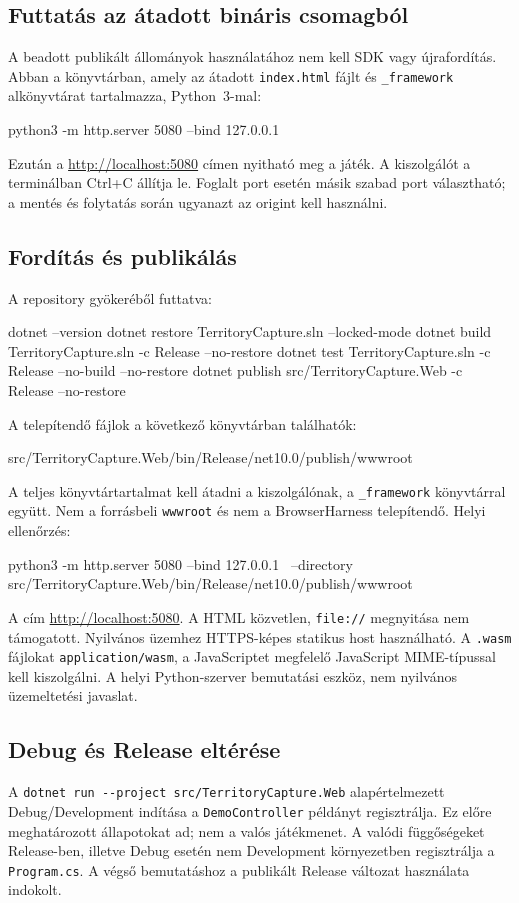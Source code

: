 \documentclass[11pt,a4paper]{article}
\newcommand{\code}[1]{\nolinkurl{#1}}
\begin{document}
\subsection{Futtatás az átadott bináris csomagból}
A beadott publikált állományok használatához nem kell SDK vagy újrafordítás. Abban a könyvtárban, amely az átadott \code{index.html} fájlt és \code{_framework} alkönyvtárat tartalmazza, Python~3-mal:
\begin{commands}
python3 -m http.server 5080 --bind 127.0.0.1
\end{commands}
Ezután a \url{http://localhost:5080} címen nyitható meg a játék. A kiszolgálót a terminálban Ctrl+C állítja le. Foglalt port esetén másik szabad port választható; a mentés és folytatás során ugyanazt az origint kell használni.

\subsection{Fordítás és publikálás}
A repository gyökeréből futtatva:
\begin{commands}
dotnet --version
dotnet restore TerritoryCapture.sln --locked-mode
dotnet build TerritoryCapture.sln -c Release --no-restore
dotnet test TerritoryCapture.sln -c Release --no-build --no-restore
dotnet publish src/TerritoryCapture.Web -c Release --no-restore
\end{commands}
A telepítendő fájlok a következő könyvtárban találhatók:
\begin{commands}
src/TerritoryCapture.Web/bin/Release/net10.0/publish/wwwroot
\end{commands}
A teljes könyvtártartalmat kell átadni a kiszolgálónak, a \code{_framework} könyvtárral együtt. Nem a forrásbeli \code{wwwroot} és nem a BrowserHarness telepítendő. Helyi ellenőrzés:
\begin{commands}
python3 -m http.server 5080 --bind 127.0.0.1 \
  --directory src/TerritoryCapture.Web/bin/Release/net10.0/publish/wwwroot
\end{commands}
A cím \url{http://localhost:5080}. A HTML közvetlen, \code{file://} megnyitása nem támogatott. Nyilvános üzemhez HTTPS-képes statikus host használható. A \code{.wasm} fájlokat \code{application/wasm}, a JavaScriptet megfelelő JavaScript MIME-típussal kell kiszolgálni. A helyi Python-szerver bemutatási eszköz, nem nyilvános üzemeltetési javaslat.

\subsection{Debug és Release eltérése}
A \code{dotnet run --project src/TerritoryCapture.Web} alapértelmezett Debug/Development indítása a \code{DemoController} példányt regisztrálja. Ez előre meghatározott állapotokat ad; nem a valós játékmenet. A valódi függőségeket Release-ben, illetve Debug esetén nem Development környezetben regisztrálja a \code{Program.cs}. A végső bemutatáshoz a publikált Release változat használata indokolt.
\end{document}
